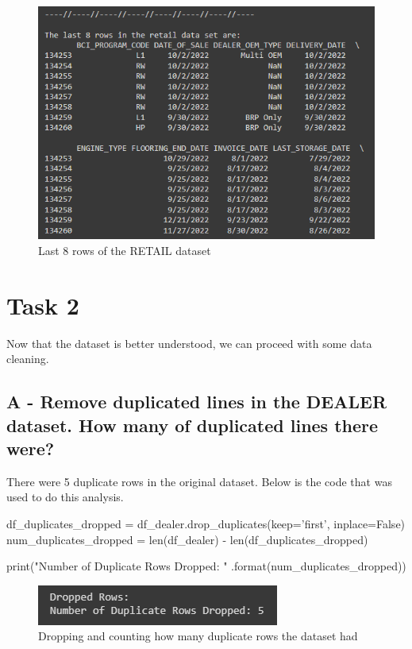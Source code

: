 \documentclass[a4paper, 12pt]{article}
\begin{document}
\begin{figure}[!htb]
	\caption{\label{img_03b} Last 8 rows of the RETAIL dataset}
	\begin{center}
		\includegraphics[scale=0.8]{img_03b.PNG}
	\end{center}
\end{figure}

\newpage
\section{Task 2}

Now that the dataset is better understood, we can proceed with some data cleaning.

\subsection{A - Remove duplicated lines in the DEALER dataset. How many of duplicated lines there were?}

There were 5 duplicate rows in the original dataset. Below is the code that was used to do this analysis.

\begin{python}
	df_duplicates_dropped = df_dealer.drop_duplicates(keep='first', inplace=False)
	num_duplicates_dropped = len(df_dealer) - len(df_duplicates_dropped)
\end{python}

\begin{python}
	print("Number of Duplicate Rows Dropped: {}" .format(num_duplicates_dropped))
\end{python}

\begin{figure}[!htb]
	\caption{\label{img_4} Dropping and counting how many duplicate rows the dataset had}
	\begin{center}
		\includegraphics[scale=1.1]{img_04.PNG}
	\end{center}
\end{figure}
\end{document}

